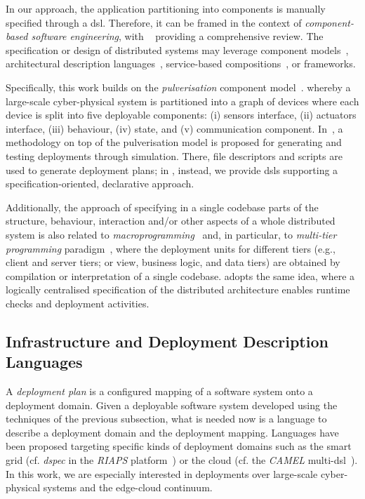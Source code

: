 \documentclass[conference]{IEEEtran}
\begin{document}
In our approach, the application partitioning into components is manually specified through a \ac{dsl}.
%
Therefore, it can be framed in the context of \emph{component-based software engineering},
 with ~\cite{vale2016component-based-se} providing a comprehensive review.
%
The specification or design of distributed systems
 may leverage
 component models~\cite{DBLP:journals/tse/CrnkovicSVC11},
 architectural description languages~\cite{DBLP:journals/tse/MedvidovicT00},
 service-based compositions~\cite{DBLP:journals/csur/LemosDB16}, 
 or frameworks.

Specifically,
 this work builds on the \emph{pulverisation} component model~\cite{FI2020-pulverization,IEEE-IoTJ-pulverization-simulation}.
 whereby a large-scale cyber-physical system
 is partitioned into a graph of devices
 where each device is split into five deployable components:
 (i) sensors interface,
 (ii) actuators interface,
 (iii) behaviour,
 (iv) state, and
 (v) communication component.
%
In~\cite{IEEE-IoTJ-pulverization-simulation},
 a methodology on top of the pulverisation model
 is proposed
 for generating and testing deployments through simulation.
%
There, file descriptors and scripts are used to generate deployment plans; in \ourframework{}, instead, we provide \acp{dsl} supporting a specification-oriented, declarative approach.
%

Additionally,
 the approach of specifying in a single codebase 
 parts of the structure, behaviour, interaction 
 and/or other aspects of a whole distributed system
 is also related to \emph{macroprogramming}~\cite{Casadei2023macro}
 and, in particular, to \emph{multi-tier programming} paradigm~\cite{DBLP:journals/csur/WeisenburgerWS20},
 where the deployment units for different tiers
(e.g., client and server tiers; or view, business logic, and data tiers)
are obtained by compilation or interpretation of a single codebase.
%
\ourframework{} adopts the same idea,
 where a logically centralised specification
 of the distributed architecture
 enables runtime checks and deployment activities.

\subsection{Infrastructure and Deployment Description Languages}
\label{sec:rw:depdesc}

A \emph{deployment plan} is a configured mapping of a software system onto a deployment domain.
%
Given a deployable software system
developed using the techniques of the previous subsection,
 what is needed now is a language to describe a deployment domain
 and the deployment mapping.
%
Languages have been proposed
 targeting specific kinds of deployment domains
 such as the smart grid (cf. \emph{dspec} in the \emph{RIAPS} platform~\cite{DBLP:conf/coins/GhoshTKKL22})
 or the cloud (cf. the \emph{CAMEL} multi-\ac{dsl}~\cite{DBLP:journals/jcloudc/AchilleosKRKDOS19}).
%
In this work,
 we are especially interested in deployments over large-scale cyber-physical systems and the edge-cloud continuum.
\end{document}
